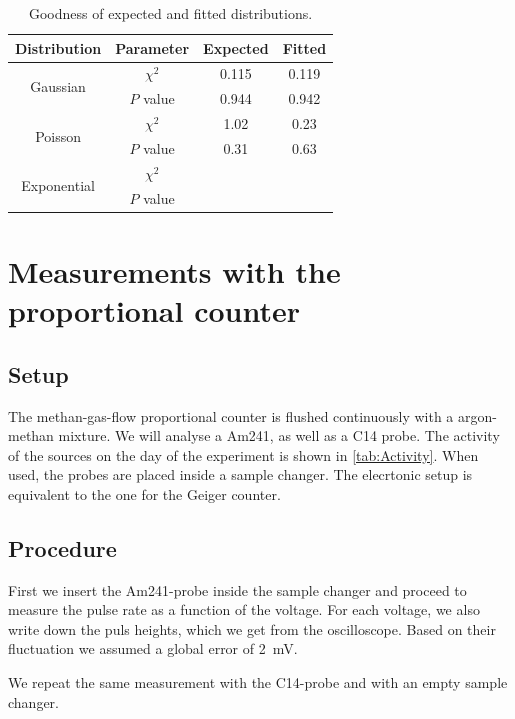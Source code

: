 \begin{table}[H]
	\renewcommand{\arraystretch}{1.5}
	\centering
	\begin{tabular}{|c|c|c|c|}
		\hline
		Distribution & Parameter & Expected & Fitted \\
		\hline
		\multirow{2}{*}{Gaussian} & $\chi^2$ & \SI{0.115}{} & \SI{0.119}{} \\
		 & $P$ value & \SI{0.944}{} & \SI{0.942}{} \\
		\hline
		\multirow{2}{*}{Poisson} & $\chi^2$ & \SI{1.02}{} & \SI{0.23}{} \\
		 & $P$ value & \SI{0.31}{} & \SI{0.63}{} \\
		\hline
		\multirow{2}{*}{Exponential} & $\chi^2$ & \SI{}{} & \SI{}{} \\
		 & $P$ value & \SI{}{} & \SI{}{} \\
		\hline
	\end{tabular}
	\caption{Goodness of expected and fitted distributions.}
	\label{tab:DistGood}
\end{table}

\section{Measurements with the proportional counter}

\subsection{Setup}

The methan-gas-flow proportional counter is flushed continuously with a argon-methan mixture. We will analyse a Am241, as well as a C14 probe. The activity of the sources on the day of the experiment is shown in \cref{tab:Activity}. When used, the probes are placed inside a sample changer. The elecrtonic setup is equivalent to the one for the Geiger counter.

\subsection{Procedure}

First we insert the Am241-probe inside the sample changer and proceed to measure the pulse rate as a function of the voltage. For each voltage, we also write down the puls heights, which we get from the oscilloscope. Based on their fluctuation we assumed a global error of \SI{2}{mV}.

We repeat the same measurement with the C14-probe and with an empty sample changer.

